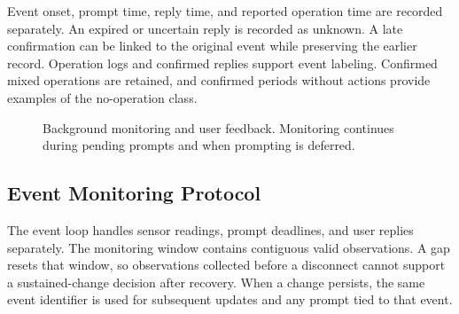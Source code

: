 \documentclass[conference]{IEEEtran}
\begin{document}
Event onset, prompt time, reply time, and reported operation time are recorded separately. An expired or uncertain reply is recorded as unknown. A late confirmation can be linked to the original event while preserving the earlier record. Operation logs and confirmed replies support event labeling. Confirmed mixed operations are retained, and confirmed periods without actions provide examples of the no-operation class.

\begin{figure}[t]
\centering
{}
\caption{Background monitoring and user feedback. Monitoring continues during pending prompts and when prompting is deferred.}
\label{fig:event-feedback-workflow}
\end{figure}

\subsection{Event Monitoring Protocol}
The event loop handles sensor readings, prompt deadlines, and user replies separately. The monitoring window contains contiguous valid observations. A gap resets that window, so observations collected before a disconnect cannot support a sustained-change decision after recovery. When a change persists, the same event identifier is used for subsequent updates and any prompt tied to that event.
\end{document}
